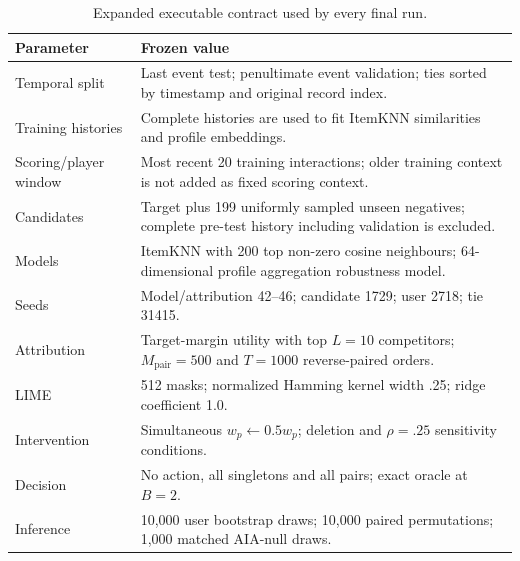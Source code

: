 \begin{table}[t]
\centering\scriptsize
\caption{Expanded executable contract used by every final run.}
\label{app:contract-table}
\begin{tabular}{@{}p{}p{}@{}}
\toprule
Parameter & Frozen value \\
\midrule
Temporal split & Last event test; penultimate event validation; ties sorted by timestamp and original record index. \\
Training histories & Complete histories are used to fit ItemKNN similarities and profile embeddings. \\
Scoring/player window & Most recent 20 training interactions; older training context is not added as fixed scoring context. \\
Candidates & Target plus 199 uniformly sampled unseen negatives; complete pre-test history including validation is excluded. \\
Models & ItemKNN with 200 top non-zero cosine neighbours; 64-dimensional profile aggregation robustness model. \\
Seeds & Model/attribution 42--46; candidate 1729; user 2718; tie 31415. \\
Attribution & Target-margin utility with top $L=10$ competitors; $M_{\mathrm{pair}}=500$ and $T=1000$ reverse-paired orders. \\
LIME & 512 masks; normalized Hamming kernel width .25; ridge coefficient 1.0. \\
Intervention & Simultaneous $w_p\leftarrow0.5w_p$; deletion and $\rho=.25$ sensitivity conditions. \\
Decision & No action, all singletons and all pairs; exact oracle at $B=2$. \\
Inference & 10,000 user bootstrap draws; 10,000 paired permutations; 1,000 matched AIA-null draws. \\
\bottomrule
\end{tabular}
\end{table}